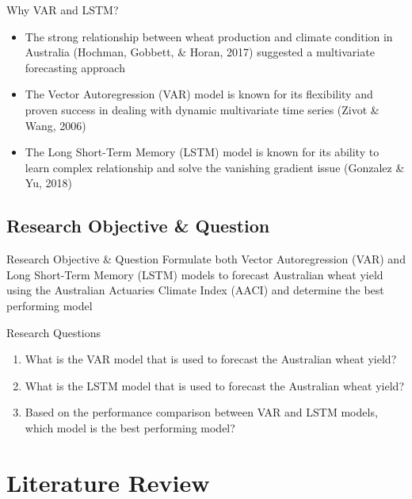 \documentclass[aspectratio=169]{beamer}
\begin{document}
\begin{frame}{Why VAR and LSTM?}
    \begin{itemize}
        \item The strong relationship between wheat production and climate condition in Australia (Hochman, Gobbett, \& Horan, 2017) suggested a multivariate forecasting approach
        \item The Vector Autoregression (VAR) model is known for its flexibility and proven success in dealing with dynamic multivariate time series (Zivot \& Wang, 2006)
        \item The Long Short-Term Memory (LSTM) model is known for its ability to learn complex relationship and solve the vanishing gradient issue (Gonzalez \& Yu, 2018)
    \end{itemize}
\end{frame}

\subsection{Research Objective \& Question}
\begin{frame}{Research Objective \& Question}
    Formulate both Vector Autoregression (VAR) and Long Short-Term Memory (LSTM) models to forecast Australian wheat yield using the Australian Actuaries Climate Index (AACI) and determine the best performing model
    \begin{exampleblock}{Research Questions}
        \begin{enumerate}
            \item What is the VAR model that is used to forecast the Australian wheat yield? 
            \item What is the LSTM model that is used to forecast the Australian wheat yield? 
            \item Based on the performance comparison between VAR and LSTM models, which model is the best performing model?
        \end{enumerate}
    \end{exampleblock}
\end{frame}

\section{Literature Review}
\end{document}
